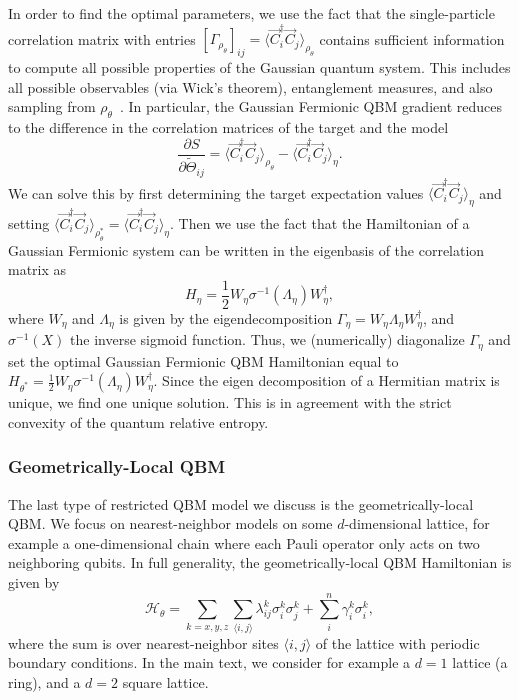 \documentclass[
    reprint,
    aps,
    prx,
    longbibliography
]{revtex4-2}
\begin{document}
In order to find the optimal parameters, we use the fact that the single-particle correlation matrix with entries $ [\Gamma_{\rho_\theta}]_{ij} = \langle \vec{C}^\dagger_i \vec{C}_j \rangle_{\rho_\theta}$ contains sufficient information to compute all possible properties of the Gaussian quantum system. This includes all possible observables (via Wick's theorem), entanglement measures, and also sampling from $\rho_\theta$~\cite{Surace_2022}. In particular, the Gaussian Fermionic QBM gradient reduces to the difference in the correlation matrices of the target and the model
\begin{equation}
\frac{\partial S}{\partial \tilde{\Theta}_{ij}} = \langle \vec{C}^\dagger_i \vec{C}_j \rangle_{\rho_\theta} - \langle \vec{C}^\dagger_i \vec{C}_j \rangle_{\eta}.
\end{equation} 
We can solve this by first determining the target expectation values $\langle \vec{C}^\dagger_i \vec{C}_j \rangle_{\eta}$ and setting $\langle \vec{C}^\dagger_i \vec{C}_j \rangle_{\rho_\theta^*} = \langle \vec{C}^\dagger_i \vec{C}_j \rangle_{\eta}$. Then we use the fact that the Hamiltonian of a Gaussian Fermionic system can be written in the eigenbasis of the correlation matrix as 
\begin{equation}
     H_\eta =  \frac{1}{2} W_\eta \sigma^{-1}(\Lambda_\eta) W^\dagger_\eta,
\end{equation} 
where $W_\eta$ and $\Lambda_\eta$ is given by the eigendecomposition $\Gamma_{\eta} = W_\eta \Lambda_\eta W_\eta^\dagger$, and $\sigma^{-1}(X)$ the inverse sigmoid function. Thus, we (numerically) diagonalize $\Gamma_{\eta}$ and set the optimal Gaussian Fermionic QBM Hamiltonian equal to $H_{\theta^*}= \frac{1}{2}W_\eta \sigma^{-1}(\Lambda_\eta) W^\dagger_\eta$. Since the eigen decomposition of a Hermitian matrix is unique, we find one unique solution. This is in agreement with the strict convexity of the quantum relative entropy.

\subsubsection*{Geometrically-Local QBM}

The last type of restricted QBM model we discuss is the geometrically-local QBM. We focus on nearest-neighbor models on some $d$-dimensional lattice, for example a one-dimensional chain where each Pauli operator only acts on two neighboring qubits. In full generality, the geometrically-local QBM Hamiltonian is given by 
\begin{equation} 
\label{eq:nnmodel}
    \mathcal{H}_\theta = \sum_{k=x,y,z}\sum_{\langle i, j\rangle}\lambda^k_{ij}\sigma_i^k\sigma^k_j + \sum_i^n \gamma^k_i\sigma^k_i,
\end{equation} 
where the sum is over nearest-neighbor sites $\langle i,j \rangle$ of the lattice with periodic boundary conditions. In the main text, we consider for example a $d=1$ lattice (a ring), and a $d=2$ square lattice.
\end{document}
